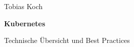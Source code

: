 \documentclass[a4paper,10pt,listof=entryprefix]{scrreport}
\begin{document}
\begin{titlepage}
  \color{white}
  \vspace*{6cm}

  \hspace*{2cm}
  \begin{minipage}{0.75\textwidth}
    {\fontsize{20}{22}\selectfont Tobias Koch\par}
    \vspace{1.5cm}

    {\fontsize{83}{70}\selectfont\bfseries Kubernetes\par}
    \vspace{0.5cm}

    {\fontsize{24}{28}\selectfont Technische Übersicht und Best Practices\par}
  \end{minipage}

  \vfill
\end{titlepage}
\end{document}
